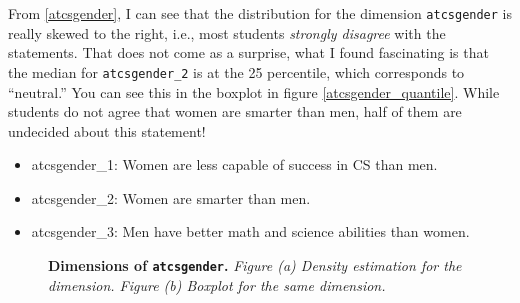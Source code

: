 From \ref{atcsgender}, I can see that the distribution for the dimension \texttt{atcsgender} is really skewed to the right, i.e., most students \emph{strongly disagree} with the statements. That does not come as a surprise, what I found fascinating is that the median for \texttt{atcsgender\_2} is at the 25 percentile, which corresponds to ``neutral.'' You can see this in the boxplot in figure \ref{atcsgender_quantile}.  While students do not agree that women are smarter than men, half of them are undecided about this statement!
\begin {itemize}
\item atcsgender\_1: Women are less capable of success in CS than men.
\item atcsgender\_2: Women are smarter than men.
\item atcsgender\_3: Men have better math and science abilities than women.
\end{itemize} 

\begin{figure}[!hbtp]
\centering

    \caption{\textbf{Dimensions of \texttt{atcsgender}.} \textit{Figure (a) Density estimation for the dimension. Figure (b) Boxplot for the same dimension.}}
\end{figure}



